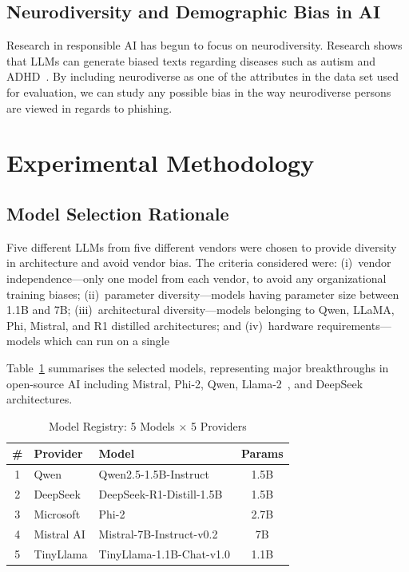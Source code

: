 \documentclass[conference]{IEEEtran}
\begin{document}
\subsection{Neurodiversity and Demographic Bias in AI}

Research in responsible AI has begun to focus on neurodiversity. Research shows that LLMs can generate biased texts regarding diseases such as autism and ADHD~\cite{dev2021measures, sun2019mitigating}. By including neurodiverse as one of the attributes in the data set used for evaluation, we can study any possible bias in the way neurodiverse persons are viewed in regards to phishing.
\section{Experimental Methodology}

\subsection{Model Selection Rationale}
Five different LLMs from five different vendors were chosen to provide diversity in architecture and avoid vendor bias. The criteria considered were: (i)~vendor independence---only one model from each vendor, to avoid any organizational training biases; (ii)~parameter diversity---models having parameter size between 1.1B and 7B; (iii)~architectural diversity---models belonging to Qwen, LLaMA, Phi, Mistral, and R1 distilled architectures; and (iv)~hardware requirements---models which can run on a single

Table~\ref{tab:models} summarises the selected models, representing major breakthroughs in open-source AI including Mistral, Phi-2, Qwen, Llama-2~\cite{touvron2023llama}, and DeepSeek architectures.

\begin{table}[H]
\centering
\caption{Model Registry: 5 Models $\times$ 5 Providers}
\label{tab:models}
\footnotesize
\begin{tabular}{@{}cllc@{}}
\toprule
\textbf{\#} & \textbf{Provider} & \textbf{Model} & \textbf{Params} \\
\midrule
1 & Qwen       & Qwen2.5-1.5B-Instruct     & 1.5B \\
2 & DeepSeek   & DeepSeek-R1-Distill-1.5B   & 1.5B \\
3 & Microsoft  & Phi-2                       & 2.7B \\
4 & Mistral AI & Mistral-7B-Instruct-v0.2   & 7B   \\
5 & TinyLlama  & TinyLlama-1.1B-Chat-v1.0   & 1.1B \\
\bottomrule
\end{tabular}
\end{table}
\end{document}
